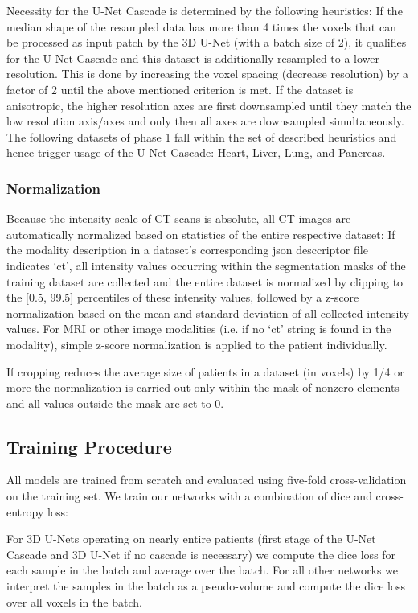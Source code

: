 \documentclass{templates/llncs}
\begin{document}
    Necessity for the U-Net Cascade is determined by the following heuristics: If the median shape of the resampled data has more than 4 times the voxels that can be processed as input patch by the 3D U-Net (with a batch size of 2), it qualifies for the U-Net Cascade and this dataset is additionally resampled to a lower resolution. This is done by increasing the voxel spacing (decrease resolution) by a factor of 2 until the above mentioned criterion is met. If the dataset is anisotropic, the higher resolution axes are first downsampled until they match the low resolution axis/axes and only then all axes are downsampled simultaneously. The following datasets of phase 1 fall within the set of described heuristics and hence trigger usage of the U-Net Cascade: Heart, Liver, Lung, and Pancreas.
    
    \subsubsection{Normalization}
    Because the intensity scale of CT scans is absolute, all CT images are automatically normalized based on statistics of the entire respective dataset: If the modality description in a dataset's corresponding json desccriptor file indicates `ct', all intensity values occurring within the segmentation masks of the training dataset are collected and the entire dataset is normalized by clipping to the [0.5, 99.5] percentiles of these intensity values, followed by a z-score normalization based on the mean and standard deviation of all collected intensity values. For MRI or other image modalities (i.e. if no `ct' string is found in the modality), simple z-score normalization is applied to the patient individually.
    
    If cropping reduces the average size of patients in a dataset (in voxels) by 1/4 or more the normalization is carried out only within the mask of nonzero elements and all values outside the mask are set to 0.
    
    
    
    \subsection{Training Procedure}
    All models are trained from scratch and evaluated using five-fold cross-validation on the training set. We train our networks with a combination of dice and cross-entropy loss:
    
    
    For 3D U-Nets operating on nearly entire patients (first stage of the U-Net Cascade and 3D U-Net if no cascade is necessary) we compute the dice loss for each sample in the batch and average over the batch. For all other networks we interpret the samples in the batch as a pseudo-volume and compute the dice loss over all voxels in the batch.
    
\end{document}
